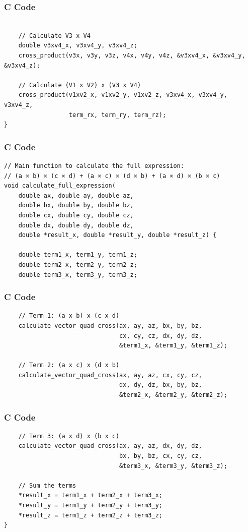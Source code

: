 \documentclass{beamer}
\begin{document}
\begin{frame}[fragile]
\frametitle{C Code}
\begin{lstlisting}

    // Calculate V3 x V4
    double v3xv4_x, v3xv4_y, v3xv4_z;
    cross_product(v3x, v3y, v3z, v4x, v4y, v4z, &v3xv4_x, &v3xv4_y, &v3xv4_z);

    // Calculate (V1 x V2) x (V3 x V4)
    cross_product(v1xv2_x, v1xv2_y, v1xv2_z, v3xv4_x, v3xv4_y, v3xv4_z,
                  term_rx, term_ry, term_rz);
}
\end{lstlisting}
\end{frame}

\begin{frame}[fragile]
\frametitle{C Code}
\begin{lstlisting}
// Main function to calculate the full expression:
// (a × b) × (c × d) + (a × c) × (d × b) + (a × d) × (b × c)
void calculate_full_expression(
    double ax, double ay, double az,
    double bx, double by, double bz,
    double cx, double cy, double cz,
    double dx, double dy, double dz,
    double *result_x, double *result_y, double *result_z) {

    double term1_x, term1_y, term1_z;
    double term2_x, term2_y, term2_z;
    double term3_x, term3_y, term3_z;

\end{lstlisting}
\end{frame}

\begin{frame}[fragile]
\frametitle{C Code}
\begin{lstlisting}
    // Term 1: (a x b) x (c x d)
    calculate_vector_quad_cross(ax, ay, az, bx, by, bz,
                                cx, cy, cz, dx, dy, dz,
                                &term1_x, &term1_y, &term1_z);

    // Term 2: (a x c) x (d x b)
    calculate_vector_quad_cross(ax, ay, az, cx, cy, cz,
                                dx, dy, dz, bx, by, bz,
                                &term2_x, &term2_y, &term2_z);
\end{lstlisting}
\end{frame}

\begin{frame}[fragile]
\frametitle{C Code}
\begin{lstlisting}
    // Term 3: (a x d) x (b x c)
    calculate_vector_quad_cross(ax, ay, az, dx, dy, dz,
                                bx, by, bz, cx, cy, cz,
                                &term3_x, &term3_y, &term3_z);

    // Sum the terms
    *result_x = term1_x + term2_x + term3_x;
    *result_y = term1_y + term2_y + term3_y;
    *result_z = term1_z + term2_z + term3_z;
}
\end{lstlisting}
\end{frame}
\end{document}
